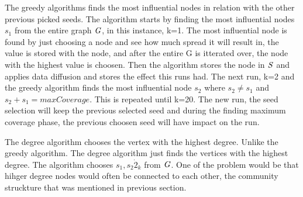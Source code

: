 The greedy algorithms finds the most influential nodes in relation with the other previous picked seeds. The algorithm starts by finding the most influential nodes $s_1$ from the entire graph $\it{G}$, in this instance, k=1. The most influential node is found by just choosing a node and see how much spread it will result in, the value is stored with the node, and after the entire G is itterated over, the node with the highest value is choosen. Then the algorithm stores the node in $\it{S}$ and applies data diffusion and stores the effect this runs had. The next run, k=2 and the greedy algorithm finds the most influential node $s_2$ where $s_2 \neq s_1$ and $s_2 +s_1 = maxCoverage$. This is repeated until k=20. The new run, the seed selection will keep the previous selected seed and during the finding maximum coverage phase, the previous choosen seed will have impact on the run.

The degree algorithm chooses the vertex with the highest degree. Unlike the greedy algorithm. The degree algorithm just finds the vertices with the highest degree. The algorithm chooses $s_1, s_2 \dot 2_k$ from $\it{G}$. One of the problem would be that hihger degree nodes would often be connected to each other, the community struckture that was mentioned in previous section.